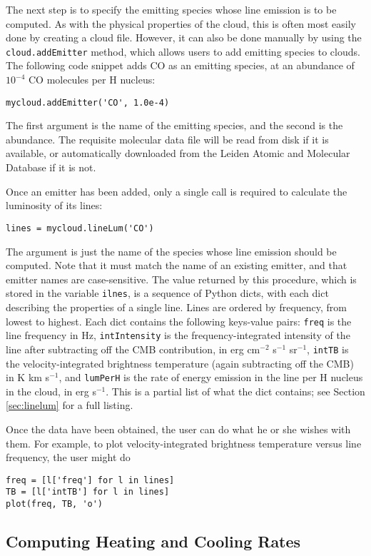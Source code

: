 \documentclass[12pt]{article}
\begin{document}
The next step is to specify the emitting species whose line emission is to be computed. As with the physical properties of the cloud, this is often most easily done by creating a cloud file. However, it can also be done manually by using the \verb=cloud.addEmitter= method, which allows users to add emitting species to clouds. The following code snippet adds CO as an emitting species, at an abundance of $10^{-4}$ CO molecules per H nucleus:
\begin{verbatim}
mycloud.addEmitter('CO', 1.0e-4)
\end{verbatim}
The first argument is the name of the emitting species, and the second is the abundance. The requisite molecular data file will be read from disk if it is available, or automatically downloaded from the Leiden Atomic and Molecular Database if it is not.

Once an emitter has been added, only a single call is required to calculate the luminosity of its lines:
\begin{verbatim}
lines = mycloud.lineLum('CO')
\end{verbatim}
The argument is just the name of the species whose line emission should be computed. Note that it must match the name of an existing emitter, and that emitter names are case-sensitive. The value returned by this procedure, which is stored in the variable \verb=ilnes=, is a sequence of Python dicts, with each dict describing the properties of a single line. Lines are ordered by frequency, from lowest to highest. Each dict contains the following keys-value pairs: \verb=freq= is the line frequency in Hz, \verb=intIntensity= is the frequency-integrated intensity of the line after subtracting off the CMB contribution, in erg cm$^{-2}$ s$^{-1}$ sr$^{-1}$, \verb=intTB= is the velocity-integrated brightness temperature (again subtracting off the CMB) in K km s$^{-1}$, and \verb=lumPerH= is the rate of energy emission in the line per H nucleus in the cloud, in erg s$^{-1}$. This is a partial list of what the dict contains; see Section \ref{sec:linelum} for a full listing.

Once the data have been obtained, the user can do what he or she wishes with them. For example, to plot velocity-integrated brightness temperature versus line frequency, the user might do
\begin{verbatim}
freq = [l['freq'] for l in lines]
TB = [l['intTB'] for l in lines]
plot(freq, TB, 'o')
\end{verbatim}

\subsection{Computing Heating and Cooling Rates}
\end{document}
